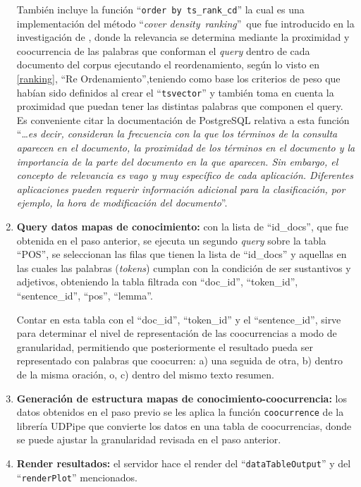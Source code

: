 \documentclass[
  12pt,
  openany]{book}
\begin{document}
\begin{enumerate}
  También incluye la función ``\texttt{order\ by\ ts\_rank\_cd}'' la cual es una implementación del método ``\emph{cover density}~\emph{ranking}''~que fue introducido en la investigación de \citep{clarke2000}, donde la relevancia se determina mediante la proximidad y coocurrencia de las palabras que conforman el \emph{query} dentro de cada documento del corpus ejecutando el reordenamiento, según lo visto en \ref{ranking}, ``Re Ordenamiento'',teniendo como base los criterios de peso que habían sido definidos al crear el ``\texttt{tsvector}'' y también toma en cuenta la proximidad que puedan tener las distintas palabras que componen el query. Es conveniente citar la documentación de PostgreSQL relativa a esta función ``\ldots{}\emph{es decir, consideran la frecuencia con la que los términos de la consulta aparecen en el documento, la proximidad de los términos en el documento y la importancia de la parte del documento en la que aparecen. Sin embargo, el concepto de relevancia es vago y muy específico de cada aplicación. Diferentes aplicaciones pueden requerir información adicional para la clasificación, por ejemplo, la hora de modificación del documento}''.\\
\item
  \textbf{Query datos mapas de conocimiento:} con la lista de ``id\_docs'', que fue obtenida en el paso anterior, se ejecuta un segundo \emph{query} sobre la tabla ``POS'', se seleccionan las filas que tienen la lista de ``id\_docs'' y aquellas en las cuales las palabras (\emph{tokens}) cumplan con la condición de ser sustantivos y adjetivos, obteniendo la tabla filtrada con ``doc\_id'', ``token\_id'', ``sentence\_id'', ``pos'', ``lemma''.

  Contar en esta tabla con el ``doc\_id'', ``token\_id'' y el ``sentence\_id'', sirve para determinar el nivel de representación de las coocurrencias a modo de granularidad, permitiendo que posteriormente el resultado pueda ser representado con palabras que coocurren: a) una seguida de otra, b) dentro de la misma oración, o, c) dentro del mismo texto resumen.
\item
  \textbf{Generación de estructura mapas de conocimiento-coocurrencia:} los datos obtenidos en el paso previo se les aplica la función \texttt{coocurrence} de la librería UDPipe \citep{udpipe-4} que convierte los datos en una tabla de coocurrencias, donde se puede ajustar la granularidad revisada en el paso anterior.
\item
  \textbf{Render resultados:} el servidor hace el render del ``\texttt{dataTableOutput}'' y del ``\texttt{renderPlot}'' mencionados.
\end{enumerate}
\end{document}
